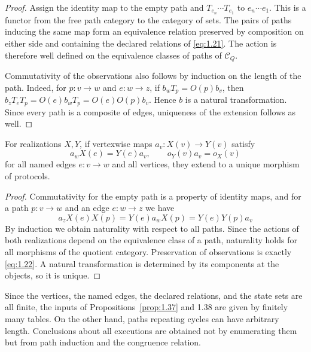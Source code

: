 \begin{proof}

Assign the identity map to the empty path and $T_{e_n}\cdots T_{e_1}$ to
$e_n\cdots e_1$.
This is a functor from the free path category to the category of sets.
The pairs of paths inducing the same map form an equivalence relation preserved
by composition on either side and containing the declared relations of
\eqref{eq:1.21}.
The action is therefore well defined on the equivalence classes of paths of
$\mathcal{C}_Q$.

Commutativity of the observations also follows by induction on the length of
the path.
Indeed, for $p:v\to w$ and $e:w\to z$, if $b_wT_p=O(p)b_v$, then
$b_zT_eT_p=O(e)b_wT_p=O(e)O(p)b_v$.
Hence $b$ is a natural transformation.
Since every path is a composite of edges, uniqueness of the extension follows
as well.

\end{proof}

\begin{proposition}\label{prop:1.38}

For realizations $X,Y$, if vertexwise maps $a_v:X(v)\to Y(v)$ satisfy
\begin{equation*}
a_wX(e)=Y(e)a_v,\qquad o_Y(v)a_v=o_X(v)
\tag{1.22}\label{eq:1.22}
\end{equation*}
for all named edges $e:v\to w$ and all vertices, they extend to a unique
morphism of protocols.

\end{proposition}

\begin{proof}

Commutativity for the empty path is a property of identity maps, and for a
path $p:v\to w$ and an edge $e:w\to z$ we have
\[
a_zX(e)X(p)=Y(e)a_wX(p)=Y(e)Y(p)a_v
\]
By induction we obtain naturality with respect to all paths.
Since the actions of both realizations depend on the equivalence class of
a path, naturality holds for all morphisms of the quotient category.
Preservation of observations is exactly \eqref{eq:1.22}.
A natural transformation is determined by its components at the objects, so it
is unique.

\end{proof}

Since the vertices, the named edges, the declared relations, and the state sets
are all finite, the inputs of Propositions~\ref{prop:1.37} and 1.38 are given
by finitely many tables.
On the other hand, paths repeating cycles can have arbitrary length.
Conclusions about all executions are obtained not by enumerating them but from
path induction and the congruence relation.


